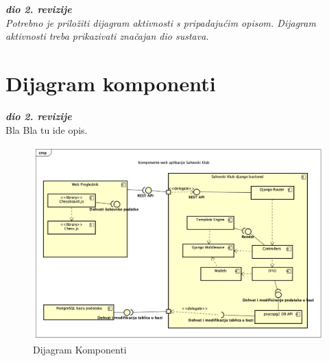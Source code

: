 			\textbf{\textit{dio 2. revizije}}\\
			
			 \textit{Potrebno je priložiti dijagram aktivnosti s pripadajućim opisom. Dijagram aktivnosti treba prikazivati značajan dio sustava.}
			
			\eject
		\section{Dijagram komponenti}
		
			\textbf{\textit{dio 2. revizije}}\\
			Bla Bla tu ide opis.
			 
			 \begin{figure}[H]
					\centerfloat
					\advance{}
        					\includegraphics[scale=0.55]{dijagrami/dijagramKomponenti.png} %
        					\caption{Dijagram Komponenti}
        					\label{fig:dijagramKomponenti}
				\end{figure}